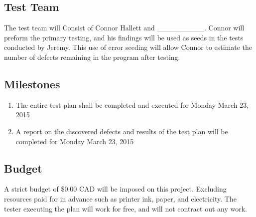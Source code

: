 \documentclass[]{article}
\begin{document}

\subsection{Test Team}
\label{sub:product_functions}
The test team will Consist of Connor Hallett and \_\_\_\_\_\_\_\_\_.  Connor
will preform the primary testing, and his findings will be used as seeds in the tests
conducted by Jeremy.  This use of error seeding will allow Connor to estimate
the number of defects remaining in the program after testing.

\subsection{Milestones}
\label{sub:user_characteristics}
\begin{enumerate}[1)]
	\item The entire test plan shall be completed and executed for Monday March 23,
	2015
	\item A report on the discovered defects and results of the test plan will be
	completed for Monday March 23, 2015
\end{enumerate}

\subsection{Budget}
\label{sub:constraints}
	A strict budget of \$0.00 CAD will be imposed on this project.  Excluding
	resources paid for in advance such as printer ink, paper, and electricity.  The
	tester executing the plan will work for free, and will not contract out any
	work.
\end{document}
